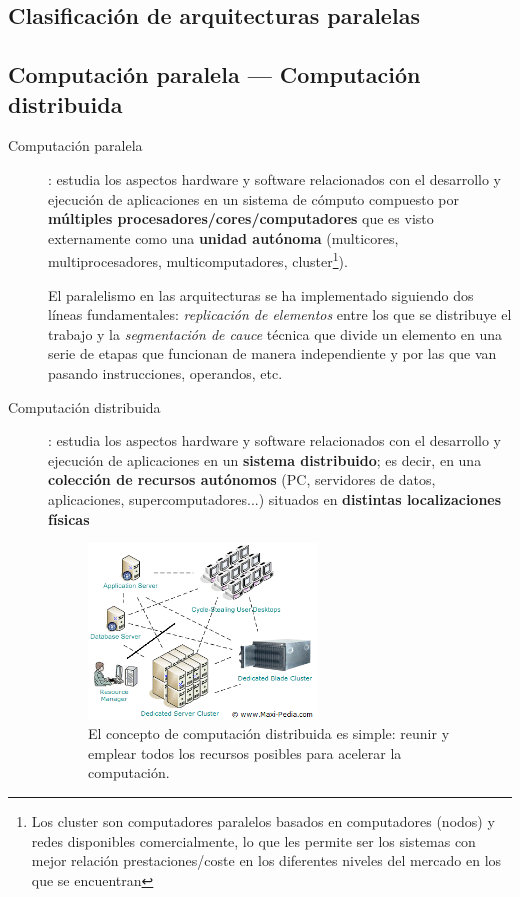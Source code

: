 \documentclass[10pt,a4paper,spanish]{report}
\begin{document}
\newpage
\textcolor[rgb]{0.2,0.4,0.8}{\section{Clasificación de arquitecturas paralelas}}
\textcolor[rgb]{0.2,0.4,0.8}{\subsection{Computación paralela --- Computación distribuida}}
\begin{description}
  \item[Computación paralela]: estudia los aspectos hardware y software relacionados con el desarrollo y ejecución de aplicaciones en un sistema de cómputo compuesto por \textbf{\textcolor[rgb]{0.2,0.4,0.8}{múltiples procesadores/cores/computadores}} que es visto externamente como una \textbf{\textcolor[rgb]{0.2,0.4,0.8}{unidad autónoma}} (multicores, multiprocesadores, multicomputadores, cluster\footnote{Los cluster son computadores paralelos basados en computadores (nodos) y redes disponibles comercialmente, lo que les permite ser los sistemas con mejor relación prestaciones/coste en los diferentes niveles del mercado en los que se encuentran}).

  El paralelismo en las arquitecturas se ha implementado siguiendo dos líneas fundamentales: \textit{\textcolor[rgb]{0.2,0.4,0.8}{replicación de elementos}} entre los que se distribuye el trabajo y la \textit{\textcolor[rgb]{0.2,0.4,0.8}{segmentación de cauce}} técnica que divide un elemento en una serie de etapas que funcionan de manera independiente y por las que van pasando instrucciones, operandos, etc.

  \item[Computación distribuida]: estudia los aspectos hardware y software relacionados con el desarrollo y ejecución de aplicaciones en un \textbf{\textcolor[rgb]{0.2,0.4,0.8}{sistema distribuido}}; es decir, en una \textbf{\textcolor[rgb]{0.2,0.4,0.8}{colección de recursos autónomos}} (PC, servidores de datos, aplicaciones, supercomputadores...) situados en \textbf{\textcolor[rgb]{0.2,0.4,0.8}{distintas localizaciones físicas}}
\begin{figure}[!h]
\centering
\includegraphics[width=0.6\textwidth]{9}
\caption{El concepto de computación distribuida es simple: reunir y emplear todos los recursos posibles para acelerar la computación.}
\label{dist_computing}
\end{figure}
\end{description}
\end{document}
